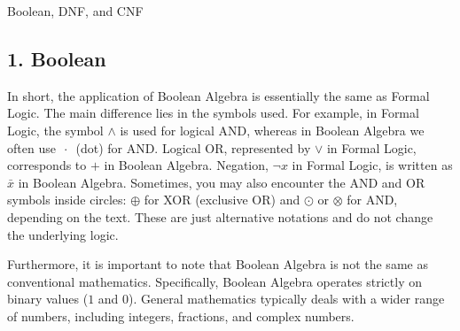 Boolean, DNF, and CNF

\subsection{1. Boolean}\label{boolean}

In short, the application of Boolean Algebra is essentially the same as
Formal Logic. The main difference lies in the symbols used. For example,
in Formal Logic, the symbol \(\land\) is used for logical AND, whereas
in Boolean Algebra we often use \(\,\cdot\,\) (dot) for AND. Logical OR,
represented by \(\lor\) in Formal Logic, corresponds to \(+\) in Boolean
Algebra. Negation, \(\neg x\) in Formal Logic, is written as \(\bar{x}\)
in Boolean Algebra. Sometimes, you may also encounter the AND and OR
symbols inside circles: \(\oplus\) for XOR (exclusive OR) and \(\odot\)
or \(\otimes\) for AND, depending on the text. These are just
alternative notations and do not change the underlying logic.

Furthermore, it is important to note that Boolean Algebra is not the
same as conventional mathematics. Specifically, Boolean Algebra operates
strictly on binary values (\(1\) and \(0\)). General mathematics
typically deals with a wider range of numbers, including integers,
fractions, and complex numbers.

